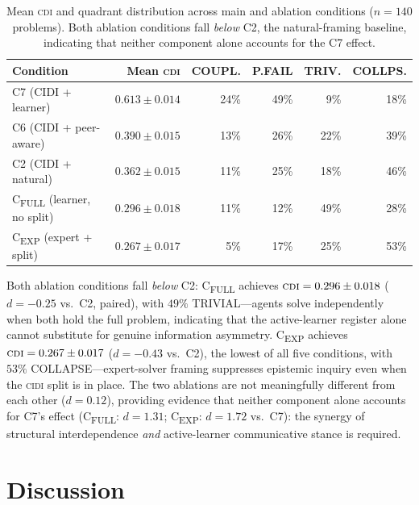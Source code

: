 \documentclass{article}
\newcommand{\CDI}{\textsc{cdi}}
\newcommand{\CIDI}{\textsc{cidi}}
\begin{document}
\begin{table}[H]
  \caption{Mean \CDI{} and quadrant distribution across main and ablation
  conditions ($n = 140$ problems). Both ablation conditions fall \emph{below}
  C2, the natural-framing baseline, indicating that neither component alone
  accounts for the C7 effect.}
  \label{tab:ablations}
  \centering
  \small
  \begin{tabular}{lrrrrr}
    \toprule
    \textbf{Condition} & \textbf{Mean \CDI{}} & \textbf{COUPL.} & \textbf{P.FAIL} & \textbf{TRIV.} & \textbf{COLLPS.} \\
    \midrule
    C7 (CIDI + learner)       & $0.613 \pm 0.014$ & 24\% & 49\% &  9\% & 18\% \\
    C6 (CIDI + peer-aware)    & $0.390 \pm 0.015$ & 13\% & 26\% & 22\% & 39\% \\
    C2 (CIDI + natural)       & $0.362 \pm 0.015$ & 11\% & 25\% & 18\% & 46\% \\
    \midrule
    C\textsubscript{FULL} (learner, no split) & $0.296 \pm 0.018$ & 11\% & 12\% & 49\% & 28\% \\
    C\textsubscript{EXP} (expert + split)     & $0.267 \pm 0.017$ &  5\% & 17\% & 25\% & 53\% \\
    \bottomrule
  \end{tabular}
\end{table}

Both ablation conditions fall \emph{below} C2: C\textsubscript{FULL}
achieves $\CDI = 0.296 \pm 0.018$ ($d = -0.25$ vs.\ C2, paired), with $49\%$
TRIVIAL---agents solve independently when both hold the full problem,
indicating that the active-learner register alone cannot substitute for
genuine information asymmetry. C\textsubscript{EXP} achieves
$\CDI = 0.267 \pm 0.017$ ($d = -0.43$ vs.\ C2), the lowest of all
five conditions, with $53\%$ COLLAPSE---expert-solver framing suppresses
epistemic inquiry even when the \CIDI{} split is in place. The two
ablations are not meaningfully different from each other ($d = 0.12$),
providing evidence that neither component alone accounts for C7's effect
(C\textsubscript{FULL}: $d = 1.31$; C\textsubscript{EXP}: $d = 1.72$
vs.\ C7): the synergy of structural interdependence \emph{and}
active-learner communicative stance is required.

\section{Discussion}
\label{sec:discussion}
\end{document}
